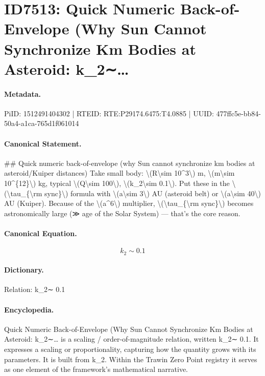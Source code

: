\section*{ID7513: Quick Numeric Back-of-Envelope (Why Sun Cannot Synchronize Km Bodies at Asteroid: k\_2∼…}
\paragraph{Metadata.}
PiID: 1512491404302 | RTEID: RTE:P29174.6475:T4.0885 | UUID: 477ffc5e-bb84-50a4-a1ca-765d1f061014

\paragraph{Canonical Statement.}
\#\# Quick numeric back-of-envelope (why Sun cannot synchronize km bodies at asteroid/Kuiper distances) Take small body: \textbackslash{}(R\textbackslash{}sim 10\textasciicircum{}3\textbackslash{}) m, \textbackslash{}(m\textbackslash{}sim 10\textasciicircum{}\{12\}\textbackslash{}) kg, typical \textbackslash{}(Q\textbackslash{}sim 100\textbackslash{}), \textbackslash{}(k\_2\textbackslash{}sim 0.1\textbackslash{}). Put these in the \textbackslash{}(\textbackslash{}tau\_\{\textbackslash{}rm sync\}\textbackslash{}) formula with \textbackslash{}(a\textbackslash{}sim 3\textbackslash{}) AU (asteroid belt) or \textbackslash{}(a\textbackslash{}sim 40\textbackslash{}) AU (Kuiper). Because of the \textbackslash{}(a\textasciicircum{}6\textbackslash{}) multiplier, \textbackslash{}(\textbackslash{}tau\_\{\textbackslash{}rm sync\}\textbackslash{}) becomes astronomically large (≫ age of the Solar System) — that’s the core reason.

\paragraph{Canonical Equation.}
\[
k_2\sim 0.1
\]

\paragraph{Dictionary.}
Relation: k\_2∼ 0.1

\paragraph{Encyclopedia.}
Quick Numeric Back-of-Envelope (Why Sun Cannot Synchronize Km Bodies at Asteroid: k\_2∼… is a scaling / order-of-magnitude relation, written k\_2∼ 0.1. It expresses a scaling or proportionality, capturing how the quantity grows with its parameters. It is built from k\_2. Within the Trawin Zero Point registry it serves as one element of the framework's mathematical narrative.
